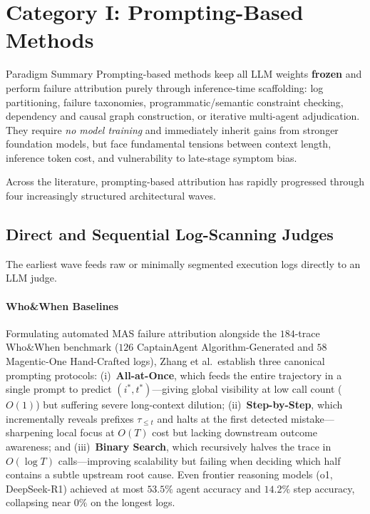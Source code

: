 \section{Category I: Prompting-Based Methods}\label{sec:prompting}

\begin{summarybox}[s1]{Paradigm Summary \hfill \promptbadge}
Prompting-based methods keep all LLM weights \textbf{frozen} and perform failure attribution purely through inference-time scaffolding: log partitioning, failure taxonomies, programmatic/semantic constraint checking, dependency and causal graph construction, or iterative multi-agent adjudication. They require \emph{no model training} and immediately inherit gains from stronger foundation models, but face fundamental tensions between context length, inference token cost, and vulnerability to late-stage symptom bias.
\end{summarybox}

Across the literature, prompting-based attribution has rapidly progressed through four increasingly structured architectural waves.

\subsection{Direct and Sequential Log-Scanning Judges}
The earliest wave feeds raw or minimally segmented execution logs directly to an LLM judge.

\paragraph{Who\&When Baselines~\citep{zhang2025who}}
Formulating automated MAS failure attribution alongside the $184$-trace Who\&When benchmark ($126$ CaptainAgent Algorithm-Generated and $58$ Magentic-One Hand-Crafted logs), Zhang et al.\ establish three canonical prompting protocols:
(i)~\textbf{All-at-Once}, which feeds the entire trajectory in a single prompt to predict $(i^*, t^*)$---giving global visibility at low call count ($O(1)$) but suffering severe long-context dilution;
(ii)~\textbf{Step-by-Step}, which incrementally reveals prefixes $\tau_{\le t}$ and halts at the first detected mistake---sharpening local focus at $O(T)$ cost but lacking downstream outcome awareness; and
(iii)~\textbf{Binary Search}, which recursively halves the trace in $O(\log T)$ calls---improving scalability but failing when deciding which half contains a subtle upstream root cause. Even frontier reasoning models (o1, DeepSeek-R1) achieved at most $53.5\%$ agent accuracy and $14.2\%$ step accuracy, collapsing near $0\%$ on the longest logs.


